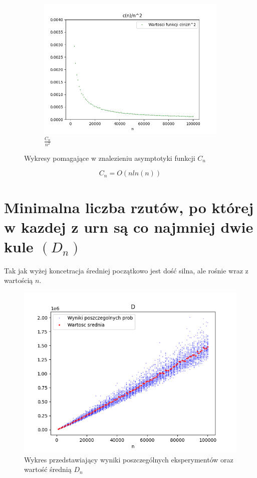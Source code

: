 \documentclass{report}
\begin{document}
\begin{figure}[H]
\begin{subfigure}{.5\textwidth}
            \centering
            \includegraphics[width=1.2\linewidth]{plotcnfunc3.png}
            \caption{\( \frac{C_n}{n^2} \)}
            \label{fig:plotcnfunc3}
          \end{subfigure}
        \caption{Wykresy pomagające w znalezieniu asymptotyki funkcji \(C_n\)}
        \label{fig:cn}
    \end{figure}
    \[C_n=O(nln(n))\]



\section*{Minimalna liczba rzutów, po której w kazdej z urn są co najmniej dwie kule \((D_n)\)}
\justifying
Tak jak wyżej koncetracja średniej początkowo jest dość silna, 
ale rośnie wraz z wartością \(n\).
\begin{figure}[htp]
        \centering
        \includegraphics[scale=0.7]{plotD.png}
        \caption[Example .]{Wykres przedstawiający wyniki poszczególnych eksperymentów oraz wartość średnią \(D_{n}\)}
        \label{plotD}
    \end{figure}
\end{document}

